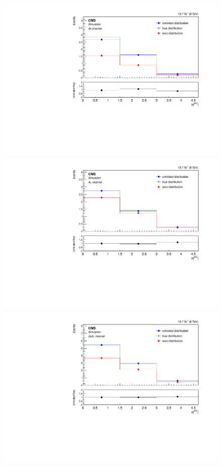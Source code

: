 \begin{figure}[hbtp]
\begin{center}
    \includegraphics[width=0.8\cmsFigWidth]{Figures/Unfolding/MCTests/EtaJet2_ZZTo4e_MadMatrix_MadDistr_HalfSample_fr}     
    \includegraphics[width=0.8\cmsFigWidth]{Figures/Unfolding/MCTests/EtaJet2_ZZTo4m_MadMatrix_MadDistr_HalfSample_fr}     
    \includegraphics[width=0.8\cmsFigWidth]{Figures/Unfolding/MCTests/EtaJet2_ZZTo2e2m_MadMatrix_MadDistr_HalfSample_fr}     

\end{center}
\end{figure}
